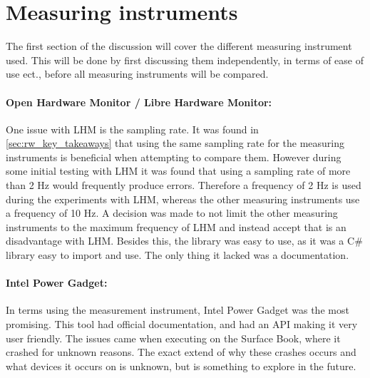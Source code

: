 \section{Measuring instruments}

The first section of the discussion will cover the different measuring instrument used. This will be done by first discussing them independently, in terms of ease of use ect., before all measuring instruments will be compared.

\paragraph*{Open Hardware Monitor / Libre Hardware Monitor:} One issue with LHM is the sampling rate. It was found in \cref{sec:rw_key_takeaways} that using the same sampling rate for the measuring instruments is beneficial when attempting to compare them. However during some initial testing with LHM it was found that using a sampling rate of more than 2 Hz would frequently produce errors. Therefore a frequency of 2 Hz is used during the experiments with LHM, whereas the other measuring instruments use a frequency of 10 Hz. A decision was made to not limit the other measuring instruments to the maximum frequency of LHM and instead accept that is an disadvantage with LHM. Besides this, the library was easy to use, as it was a C\# library easy to import and use. The only thing it lacked was a documentation.

\paragraph*{Intel Power Gadget:} In terms using the measurement instrument, Intel Power Gadget was the most promising. This tool had official documentation, and had an API making it very user friendly. The issues came when executing on the Surface Book, where it crashed for unknown reasons. The exact extend of why these crashes occurs and what devices it occurs on is unknown, but is something to explore in the future.

